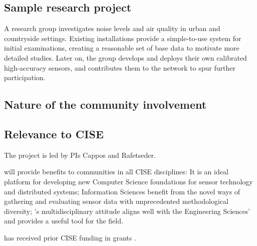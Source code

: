 \subsection{Sample research project}

A research group investigates noise levels and air quality in
urban and countryside settings. Existing \sysname installations
provide a simple-to-use system for initial examinations, creating
a reasonable set of base data to motivate more detailed studies.
Later on, the group develops and deploys their own calibrated
high-accuracy sensors, and contributes them to the \sysname network
to spur further participation.



\subsection{Nature of the community involvement}



\subsection{Relevance to CISE}

The project is led by PIs Cappos and Rafetseder.

\sysname will provide benefits to communities in all CISE disciplines:
It is an ideal platform for developing new Computer Science
foundations for sensor technology and distributed systems;
Information Sciences benefit from the novel ways of gathering
and evaluating sensor data with unprecedented methodological
diversity; %
\sysname's multidisciplinary attitude aligns well with the
Engineering Sciences' and provides a useful tool for the field.

\sysname has received prior CISE funding in grants .